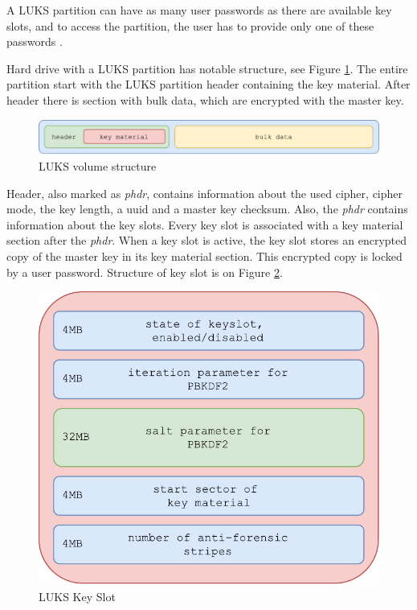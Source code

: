 \documentclass[../xdudla00-porting-Tang-to-Open-WRT.tex]{subfiles}
\begin{document}
A LUKS partition can have as many user passwords as there are available key slots, and to access the partition, the user has to provide only one of these passwords \cite{LUKS}.

Hard drive with a LUKS partition has notable structure, see Figure \ref{fig:luksvol}.
The entire partition start with the LUKS partition header containing the key material. 
After header there is section with bulk data, which are encrypted with the master key.

\begin{figure}[h]
    \centering
    \includegraphics[scale=0.7]{figures/LUKSdrive.pdf}
    \caption{LUKS volume structure}
    \label{fig:luksvol}
\end{figure}

Header, also marked as {\it phdr}, contains information about the used cipher, cipher mode, the key length, a uuid and a master key checksum.
Also, the {\it phdr} contains information about the key slots. 
Every key slot is associated with a key material section after the {\it phdr}.  
When a key slot is active, the key slot stores an encrypted copy of the master key in its key material section.
This encrypted copy is locked by a user password.
Structure of key slot is on Figure \ref{fig:luksslot}.

\begin{figure}[h]
    \centering
    \includegraphics[scale=0.6]{figures/LUKSkeyslot.pdf}
    \caption{LUKS Key Slot}
    \label{fig:luksslot}
\end{figure}
\end{document}
